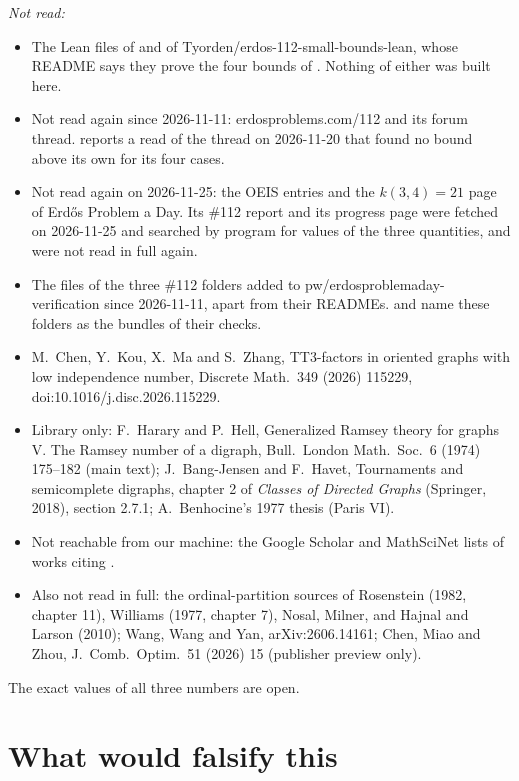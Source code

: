 \documentclass[11pt]{amsart}
\theoremstyle{plain}
\theoremstyle{definition}
\theoremstyle{remark}
\begin{document}
\medskip
\noindent\emph{Not read:}
\begin{itemize}
\item The Lean files of \cite{OrdenLean} and of Tyorden/erdos-112-small-bounds-lean, whose README
says they prove the four bounds of \cite{Orden2}. Nothing of either was built here.
\item Not read again since 2026-11-11: erdosproblems.com/112 and its forum thread. \cite{Orden2}
reports a read of the thread on 2026-11-20 that found no bound above its own for its four cases.
\item Not read again on 2026-11-25: the OEIS entries and the $k(3,4)=21$ page of Erd\H{o}s Problem a
Day. Its \#112 report and its progress page were fetched on 2026-11-25 and searched by program for
values of the three quantities, and were not read in full again.
\item The files of the three \#112 folders added to pw/erdosproblemaday-verification since
2026-11-11, apart from their READMEs. \cite{EPAD} and \cite{EPAD2} name these folders as the
bundles of their checks.
\item M.~Chen, Y.~Kou, X.~Ma and S.~Zhang, TT3-factors in oriented graphs with low independence
number, Discrete Math.\ 349 (2026) 115229, doi:10.1016/j.disc.2026.115229.
\item Library only: F.~Harary and P.~Hell, Generalized Ramsey theory for graphs V. The Ramsey number
of a digraph, Bull.\ London Math.\ Soc.\ 6 (1974) 175--182 (main text); J.~Bang-Jensen and
F.~Havet, Tournaments and semicomplete digraphs, chapter 2 of \emph{Classes of Directed Graphs}
(Springer, 2018), section 2.7.1; A.~Benhocine's 1977 thesis (Paris VI).
\item Not reachable from our machine: the Google Scholar and MathSciNet lists of works citing
\cite{IRW21}.
\item Also not read in full: the ordinal-partition sources of Rosenstein (1982, chapter 11),
Williams (1977, chapter 7), Nosal, Milner, and Hajnal and Larson (2010); Wang, Wang and Yan,
arXiv:2606.14161; Chen, Miao and Zhou, J.\ Comb.\ Optim.\ 51 (2026) 15 (publisher preview only).
\end{itemize}

\noindent The exact values of all three numbers are open.

\section{What would falsify this}\label{sec:falsify}
\end{document}
